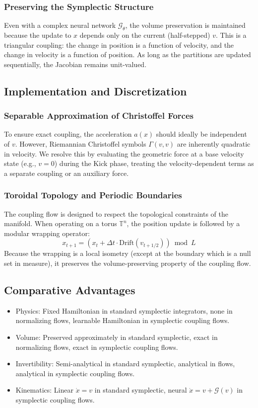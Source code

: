 \documentclass{article}
\numberwithin{equation}{section}
\begin{document}
\subsubsection{Preserving the Symplectic Structure}
Even with a complex neural network $\mathcal{G}_\theta$, the volume preservation is maintained because the update to $x$ depends only on the current (half-stepped) $v$. This is a triangular coupling: the change in position is a function of velocity, and the change in velocity is a function of position. As long as the partitions are updated sequentially, the Jacobian remains unit-valued.

\subsection{Implementation and Discretization}
\subsubsection{Separable Approximation of Christoffel Forces}
To ensure exact coupling, the acceleration $a(x)$ should ideally be independent of $v$. However, Riemannian Christoffel symbols $\Gamma(v, v)$ are inherently quadratic in velocity. We resolve this by evaluating the geometric force at a base velocity state (e.g., $v=0$) during the Kick phase, treating the velocity-dependent terms as a separate coupling or an auxiliary force.

\subsubsection{Toroidal Topology and Periodic Boundaries}
The coupling flow is designed to respect the topological constraints of the manifold. When operating on a torus $\mathbb{T}^n$, the position update is followed by a modular wrapping operator:
\[
x_{t+1} = (x_t + \Delta t \cdot \text{Drift}(v_{t+1/2})) \bmod L
\]
Because the wrapping is a local isometry (except at the boundary which is a null set in measure), it preserves the volume-preserving property of the coupling flow.

\subsection{Comparative Advantages}
\begin{itemize}
\item Physics: Fixed Hamiltonian in standard symplectic integrators, none in normalizing flows, learnable Hamiltonian in symplectic coupling flows.
\item Volume: Preserved approximately in standard symplectic, exact in normalizing flows, exact in symplectic coupling flows.
\item Invertibility: Semi-analytical in standard symplectic, analytical in flows, analytical in symplectic coupling flows.
\item Kinematics: Linear $\dot{x}=v$ in standard symplectic, neural $\dot{x}=v+\mathcal{G}(v)$ in symplectic coupling flows.
\end{itemize}
\end{document}
